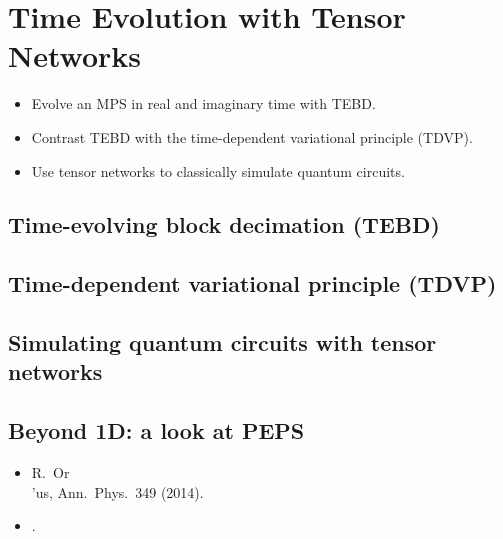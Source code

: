 \chapter{Time Evolution with Tensor Networks}
\label{ch:lec17}

\begin{objectives}
\begin{itemize}[leftmargin=1.4em,nosep]
  \item Evolve an MPS in real and imaginary time with TEBD.
  \item Contrast TEBD with the time-dependent variational principle (TDVP).
  \item Use tensor networks to classically simulate quantum circuits.
\end{itemize}
\end{objectives}


\section{Time-evolving block decimation (TEBD)}
\label{sec:lec17-1}

\section{Time-dependent variational principle (TDVP)}
\label{sec:lec17-2}

\section{Simulating quantum circuits with tensor networks}
\label{sec:lec17-3}

\section{Beyond 1D: a look at PEPS}
\label{sec:lec17-4}

\exercisesection
\begin{exercise}
\end{exercise}
\begin{exercise}
\end{exercise}
\begin{exercise}
\end{exercise}

\readingsection
\begin{itemize}[leftmargin=1.4em]
  \item R.~Or\\'us, Ann.~Phys.~349 (2014).
  \item {}.
\end{itemize}
